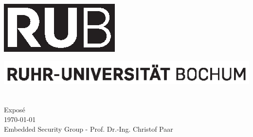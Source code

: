 %
%

\frontmatter

\begin{titlepage}
 \enlargethispage{3cm}
 \vspace*{-32mm}\hspace*{120mm}
 \includegraphics{images/rub_logo}
 
 \vspace*{12cm}\hspace*{0mm}
 \begin{minipage}[b]{1\linewidth}
  \sffamily
  \hspace{-17.2mm}
  \includegraphics[scale=1.0]{images/rub_slogan.eps}\\
  
  \nohyphens{
   {\bf \LARGE \sffamily {\thtitle}}
  }\\
  
  \large{
   \thauthor
  }\\
  
  \vspace*{35mm}
  \normalsize{
   Expos\'{e}\\
   \today\\
   Embedded Security Group - Prof. Dr.-Ing. Christof Paar\\
  }
 \end{minipage}
\end{titlepage}


\newpage\thispagestyle{empty}
